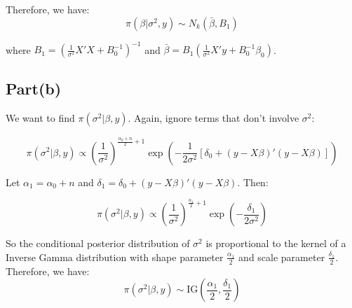 \documentclass[a4paper]{article}
\begin{document}
    Therefore, we have:
    $$\pi(\beta | \sigma^2, y) \sim N_k(\bar{\beta}, B_1)$$
    
    where $B_1 = \left(\frac{1}{\sigma^2} X' X + B_0^{-1}\right)^{-1}$ and $\bar{\beta} = B_1 \left(\frac{1}{\sigma^2} X' y + B_0^{-1} \beta_0\right)$.

\subsection*{Part(b)}

    We want to find $\pi(\sigma^2 | \beta, y)$. Again, ignore terms that don't involve $\sigma^2$:
   
    $$\pi(\sigma^2 | \beta, y) \propto \left(\frac{1}{\sigma^2}\right)^{\frac{\alpha_0 + n}{2} + 1} \exp\left(-\frac{1}{2\sigma^2} \left[ \delta_0 + (y - X\beta)'(y - X\beta) \right] \right)$$

    Let \(\alpha_1 = \alpha_0 + n\) and \(\delta_1 = \delta_0 + (y-X\beta)'(y-X\beta)\). Then:

    $$\pi(\sigma^2|\beta,y) \propto \left(\frac{1}{\sigma^2}\right)^{\frac{\alpha_1}{2}+1} \exp\left(-\frac{\delta_1}{2\sigma^2}\right)$$

    So the conditional posterior distribution of \(\sigma^2\) is proportional to the kernel of a Inverse Gamma distribution with shape parameter \(\frac{\alpha_1}{2}\) and scale parameter \(\frac{\delta_1}{2}\).
    Therefore, we have:
    $$\pi(\sigma^2 | \beta, y) \sim \text{IG}\left(\frac{\alpha_1}{2}, \frac{\delta_1}{2}\right)$$
\end{document}
